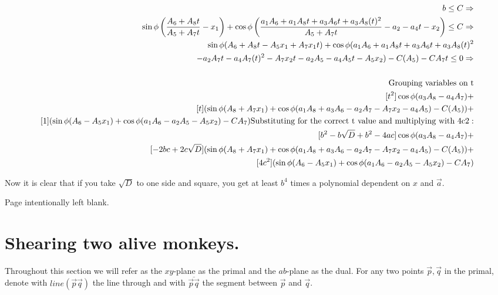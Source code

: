 \documentclass{article}
\begin{document}
\begin{align*}
     b \le C \Rightarrow \\
             \sin \phi \left(\frac{ A_6 + A_8 t}
      { A_5  + A_7 t } - x_1 \right)  + \cos \phi \left( \frac{ a_1A_6 + a_1A_8 t +  a_3A_6 t +  a_3A_8 (t)^2 }{A_5 + A_7t} - a_2 - a_4 t - x_2 \right)  \le C \Rightarrow \\
      \sin \phi (A_6 + A_8 t  - A_5x_1  + A_7 x_1 t ) + 
      \cos \phi ( a_1A_6 + a_1 A_8 t +  a_3A_6 t +  a_3A_8 (t)^2  \\
      - a_2 A_7t - a_4A_7 (t)^2 - A_7 x_2 t - a_2A_5 - a_4A_5 t - A_5x_2) - C(A_5) - CA_7t \le 0 \Rightarrow \\
      \quad \\
      \textnormal{Grouping variables on t} \\
      [t^2] \cos \phi( a_3A_8- a_4A_7 ) + \\
      [t]  ( \sin \phi (A_8 + A_7 x_1) +
      \cos \phi (a_1 A_8 + a_3A_6 - a_2 A_7 - A_7 x_2- a_4A_5)- C(A_5)) + \\
      [1] ( \sin \phi (A_6  - A_5x_1) + 
      \cos \phi ( a_1A_6- a_2A_5  - A_5x_2) - CA_7 )
    \textnormal{Substituting for the correct t value and multiplying with 4c2}:\\
          [b^2 - b\sqrt{D} + b^2 - 4ac] \cos \phi( a_3A_8- a_4A_7 ) + \\
      [-2bc + 2c\sqrt{D}]  ( \sin \phi (A_8 + A_7 x_1) +
      \cos \phi (a_1 A_8 + a_3A_6 - a_2 A_7 - A_7 x_2- a_4A_5)- C(A_5)) + \\
      [4c^2] ( \sin \phi (A_6  - A_5x_1) + 
      \cos \phi ( a_1A_6- a_2A_5  - A_5x_2) - CA_7 )
\end{align*}

Now it is clear that if you take $\sqrt{D}$ to one side and square, you get at least $b^4$ times a polynomial dependent on $x$ and $\vec{a}$. 

\newpage

Page intentionally left blank.
\newpage



\section{Shearing two alive monkeys.}




Throughout this section we will refer as the $xy$-plane as the primal and the $ab$-plane as the dual. For any two points $\vec{p}, \vec{q}$ in the primal, denote  with $line(\vec{p}\vec{q})$ the line through and with $\overline{\vec{p}\vec{q}}$ the segment between $\vec{p}$ and $\vec{q}$.
\end{document}
